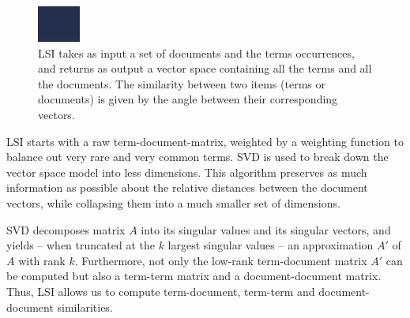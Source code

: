 \documentclass[10pt]{book}
\begin{document}
\begin{figure}[htb]
\begin{center}
\includegraphics[width=.8\columnwidth]{lsi}
\caption{LSI takes as input a set of documents and the terms occurrences, and returns as output a vector space containing all the terms and all the documents. The similarity between two items (\ie terms or documents) is given by the angle between their corresponding vectors.}
\label{fig:lsi}
\end{center}
\end{figure}

LSI starts with a raw term-document-matrix, weighted by a weighting function to balance out very rare and very common terms. SVD is used to break down the vector space model into less dimensions. This algorithm preserves as much information as possible about the relative distances between the document vectors, while collapsing them into a much smaller set of dimensions.

SVD decomposes matrix $A$ into its singular values and its singular vectors, and yields -- when truncated at the $k$ largest singular values -- an approximation $A'$ of $A$ with rank $k$. Furthermore, not only the low-rank term-document matrix $A'$ can be computed but also a term-term matrix and a document-document matrix. Thus, LSI allows us to compute term-document, term-term and document-document similarities.
\end{document}
